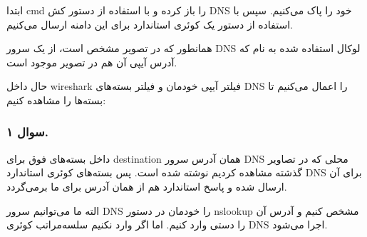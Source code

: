 
ابتدا cmd را باز کرده و با استفاده از دستور 
کش DNS خود را پاک می‌کنیم. سپس با استفاده از دستور 
یک کوئری استاندارد برای این دامنه ارسال می‌کنیم.

{
}

همانطور که در تصویر مشخص است، از یک سرور DNS لوکال استفاده شده به نام 
که آدرس آیپی آن هم در تصویر موجود است. 

حال داخل wireshark فیلتر آیپی خودمان و فیلتر بسته‌های DNS را اعمال می‌کنیم تا بسته‌ها را مشاهده کنیم:

{
}


\subsubsection*{سوال ۱.}

داخل بسته‌های فوق برای destination همان آدرس سرور DNS محلی که در تصاویر گذشته مشاهده کردیم نوشته شده است. پس بسته‌های کوئری استاندارد DNS‌ برای آن ارسال شده و پاسخ استاندارد هم از همان آدرس برای ما برمی‌گردد.

الته ما می‌توانیم سرور DNS را خودمان در دستور nslookup مشخص کنیم و آدرس آن را دستی وارد کنیم. اما اگر وارد نکنیم سلسه‌مراتب کوئری DNS اجرا می‌شود.

